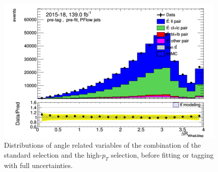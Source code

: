 \documentclass[letterpaper,12pt]{article}
\begin{document}
\begin{figure}
\begin{minipage}[b]{.45\textwidth}
\end{minipage}\hfill
\begin{minipage}[b]{.45\textwidth}
\centering
\includegraphics[width=1\textwidth]{Oct_distributions/pretagNoRwDL1rwithhighpTPFlow_scaledall/DataMC_dRWhadblep.png} 
\end{minipage}
\caption{Distributions of angle related variables of the combination of the standard selection and the high-$p_T$ selection, before fitting or tagging with full uncertainties.} \label{fig:angles_PFlow}
\end{figure}
\end{document}
